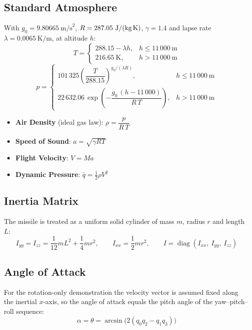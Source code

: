 \documentclass[11pt, a4paper]{article}
\newcommand{\diag}{\operatorname{diag}}
\begin{document}
\subsection{Standard Atmosphere}
With $g_0 = 9.80665\ \text{m/s}^2$, $R = 287.05\ \text{J/(kg\,K)}$, $\gamma = 1.4$ and lapse rate $\lambda = 0.0065\ \text{K/m}$, at altitude $h$:
\begin{equation}
T =
\begin{cases}
288.15 - \lambda h, & h \le 11\,000\ \text{m} \\
216.65\ \text{K}, & h > 11\,000\ \text{m}
\end{cases}
\end{equation}
\begin{equation}
p =
\begin{cases}
101\,325 \left( \dfrac{T}{288.15} \right)^{g_0 / (\lambda R)}, & h \le 11\,000\ \text{m} \\[2ex]
22\,632.06\, \exp\!\left( -\dfrac{g_0\, (h - 11\,000)}{R\, T} \right), & h > 11\,000\ \text{m}
\end{cases}
\end{equation}
\begin{itemize}
    \item \textbf{Air Density} (ideal gas law): $\rho = \dfrac{p}{R\, T}$
    \item \textbf{Speed of Sound}: $a = \sqrt{\gamma R T}$
    \item \textbf{Flight Velocity}: $V = M a$
    \item \textbf{Dynamic Pressure}: $\bar{q} = \tfrac{1}{2} \rho V^2$
\end{itemize}

\subsection{Inertia Matrix}
The missile is treated as a uniform solid cylinder of mass $m$, radius $r$ and length $L$:
\begin{equation}
I_{yy} = I_{zz} = \frac{1}{12} m L^2 + \frac{1}{4} m r^2,
\qquad
I_{xx} = \frac{1}{2} m r^2,
\qquad
I = \diag\!\left( I_{xx},\ I_{yy},\ I_{zz} \right)
\end{equation}

\subsection{Angle of Attack}
For the rotation-only demonstration the velocity vector is assumed fixed along the inertial $x$-axis, so the angle of attack equals the pitch angle of the yaw--pitch--roll sequence:
\begin{equation}
\alpha = \theta = \arcsin\!\big( 2 (q_0 q_2 - q_1 q_3) \big)
\end{equation}
\end{document}
